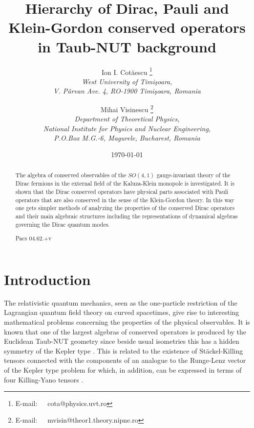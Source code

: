 \documentclass[a4paper,12pt]{article}
\begin{document}
\def\Eh{\mbox{\teneufm\char 83}}


\title{Hierarchy of Dirac, Pauli and Klein-Gordon conserved operators in  
Taub-NUT background}

\author{Ion I. Cot\u aescu \thanks{E-mail:~~~cota@physics.uvt.ro}\\ 
{\small \it West University of Timi\c soara,}\\
       {\small \it V. P\^ arvan Ave. 4, RO-1900 Timi\c soara, Romania}
\and
Mihai Visinescu \thanks{E-mail:~~~mvisin@theor1.theory.nipne.ro}\\
{\small \it Department of Theoretical Physics,}\\
{\small \it National Institute for Physics and Nuclear Engineering,}\\
{\small \it P.O.Box M.G.-6, Magurele, Bucharest, Romania}}
\date{\today}

\maketitle

\begin{abstract}
The algebra of conserved observables of the $SO(4,1)$ gauge-in\-va\-riant 
theory of the Dirac fermions in the external field of the Kaluza-Klein 
monopole is investigated. It is shown that the Dirac conserved operators 
have physical parts associated with Pauli operators that are also conserved 
in the sense of the Klein-Gordon theory. In this way one gets simpler 
methods of analyzing the properties of the conserved Dirac operators and 
their main algebraic structures including the representations of dynamical 
algebras governing the Dirac quantum modes.


Pacs 04.62.+v

\end{abstract}

\newpage

\section{Introduction}

The relativistic quantum mechanics, seen as the one-particle restriction of 
the Lagrangian quantum field theory on curved spacetimes, give rise to 
interesting mathematical problems concerning the properties of the physical  
observables. It is known that one of the largest algebras of conserved 
operators is produced by the Euclidean Taub-NUT geometry since beside usual 
isometries this has a hidden symmetry of the Kepler type \cite{GM,GRFH}. 
This is related to the existence of St\" ackel-Killing tensors connected 
with the components of an analogue to the Runge-Lenz vector of the Kepler 
type problem for which, in addition, can be expressed in terms of four 
Killing-Yano tensors \cite{GRFH,vH1,VV}. 
\end{document}
